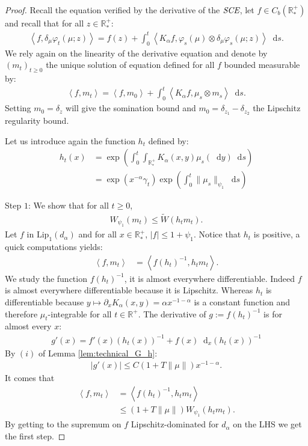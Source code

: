 \documentclass[11pt,a4paper]{article}
\newcommand{\RR}{\mathbb{R}}
\newcommand{\RRP}{\mathbb{R}^+_*}
\newcommand{\SCE}{\emph{SCE}}
\newcommand{\Proc}[1]{\left(#1\right)_{t\geq 0}}
\newcommand{\brac}[1]{\left\langle#1\right\rangle}
\newcommand{\dd}{\mathop{}\!\mathrm{d}}
\begin{document}
\begin{proof}
    Recall the equation verified by the derivative of the $\SCE$, let $f\in C_b(\RRP)$ and recall that for all $z \in \RRP$:
    \begin{align*}
        \brac{f,\delta_\mu\varphi_t(\mu;z)} = f(z) + \int_0^t \brac{K_\alpha f, \varphi_s(\mu)\otimes\delta_\mu\varphi_s(\mu;z)} \dd s.
    \end{align*}
    We rely again on the linearity of the derivative equation and denote by $\Proc{m_t}$ the unique solution of equation defined for all $f$  bounded measurable by:
    \begin{align*}
        \brac{f,m_t} = \brac{f,m_0} + \int_0^t \brac{K_\alpha f, \mu_s \otimes m_s} \dd s.
    \end{align*}
    Setting $m_0 = \delta_z$ will give the somination bound and $m_0 = \delta_{z_1} - \delta_{z_2}$ the Lipschitz regularity bound. 

    Let us introduce again the function $h_t$ defined by:
    \begin{align*}
        h_t(x) &= \exp\left(\int_0^t \int_{\RRP}K_\alpha(x,y)\mu_s(\dd y) \dd s\right)\\
        &= \exp\left(x^{-\alpha}\gamma_t\right)\exp\left( {\int_0^t\|\mu_s\|_{\psi_1}\dd s}\right)  
    \end{align*}

    Step $1$: We show that for all $t \geq 0$, 
    \begin{align*}
        W_{\psi_1}\left(m_t\right) \leq \tilde{W}\left(h_tm_t\right).
    \end{align*}
    Let $f$ in $\text{Lip}_1(d_\alpha)$ and for all $x \in \RRP$, $|f| \leq 1 + \psi_1$. Notice that $h_t$ is positive, a quick computations yields:
    \begin{align*}
        \brac{f,m_t} &= \brac{f(h_t)^{-1},h_tm_t}.
    \end{align*}
    We study the function $f (h_t)^{-1}$, it is almost everywhere differentiable. Indeed $f$ is almost everywhere differentiable because it is Lipschitz. Whereas $h_t$ is differentiable because $y \mapsto \partial_x K_\alpha(x,y) = \alpha x^{-1-\alpha}$ is a constant function and therefore $\mu_t$-integrable for all $t \in \RR^+$. The derivative of $g:=f (h_t)^{-1}$ is for almost every $x$:
    \begin{align*}
        g'(x) = f'(x)(h_t(x))^{-1} + f(x) \dd_x(h_t(x))^{-1}
    \end{align*}
    By $(i)$ of Lemma \ref{lem:technical_G_h}:
    \begin{align*}
        \left| g'(x) \right| \leq C(1 + T\|\mu\|) x^{-1-\alpha}.
    \end{align*}
    It comes that 
    \begin{align*}
        \brac{f,m_t} &= \brac{f(h_t)^{-1},h_tm_t} \\
        &\leq  \left(1 + T\|\mu\| \right)W_{\psi_1}\left(h_tm_t\right).
    \end{align*}
    By getting to the supremum on $f$ Lipschitz-dominated for $d_{\alpha}$ on the LHS we get the first step.


\end{proof}
\end{document}
